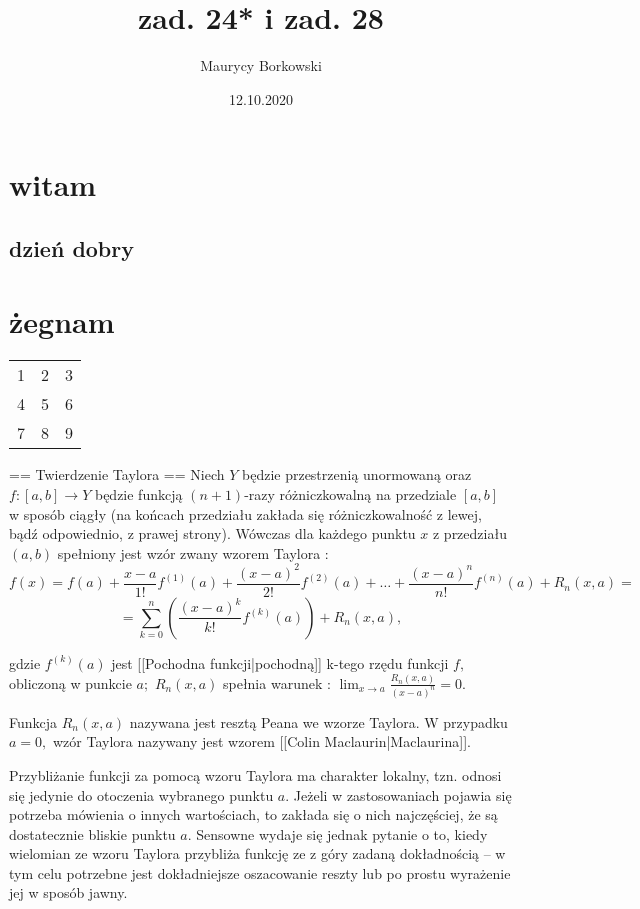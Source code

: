 \documentclass{article}
\title{zad. 24* i zad. 28}
\date{12.10.2020}
\author{Maurycy Borkowski}
\begin{document}
\section{witam}
\subsection{dzień dobry}
\section{żegnam}

\begin{center}
\begin{tabular}{ |c|c|c| } 
 \hline
 1 & 2 & 3 \\ 
 4 & 5 & 6 \\ 
 7 & 8 & 9 \\ 
 \hline
\end{tabular}
\end{center}

== Twierdzenie Taylora ==
Niech $Y$ będzie przestrzenią unormowaną oraz $f\colon [a,b]\to Y$ będzie funkcją $(n+1)$-razy różniczkowalną na przedziale $[a,b]$ w sposób ciągły (na końcach przedziału zakłada się różniczkowalność z lewej, bądź odpowiednio, z prawej strony). Wówczas dla każdego punktu $x$ z przedziału $(a,b)$ spełniony jest wzór zwany wzorem Taylora
:
$$
f(x) = f(a) + \frac{x-a}{1!} f^{(1)}(a) + \frac{(x-a)^2}{2!} f^{(2)}(a) + \ldots + \frac{(x-a)^n}{n!} f^{(n)}(a) + R_n(x,a) = $$$$
= \sum\limits_{k=0}^n \left( \frac{(x-a)^k}{k!} f^{(k)}(a) \right) + R_n(x,a),
$$

gdzie $f^{(k)}(a)$ jest [[Pochodna funkcji|pochodną]] k-tego rzędu funkcji $f,$ obliczoną w punkcie $a;$ $R_n(x,a)$ spełnia warunek
: $\lim_{x\to a}\frac{R_n(x,a)}{(x-a)^n}=0.$

Funkcja $R_n(x,a)$ nazywana jest resztą Peana we wzorze Taylora. W przypadku $a=0,$ wzór Taylora nazywany jest wzorem [[Colin Maclaurin|Maclaurina]].

Przybliżanie funkcji za pomocą wzoru Taylora ma charakter lokalny, tzn. odnosi się jedynie do otoczenia wybranego punktu $a.$ Jeżeli w zastosowaniach pojawia się potrzeba mówienia o innych wartościach, to zakłada się o nich najczęściej, że są dostatecznie bliskie punktu $a.$ Sensowne wydaje się jednak pytanie o to, kiedy wielomian ze wzoru Taylora przybliża funkcję ze z góry zadaną dokładnością – w tym celu potrzebne jest dokładniejsze oszacowanie reszty lub po prostu wyrażenie jej w sposób jawny.


\end{document}
